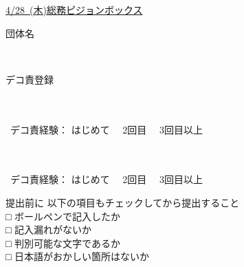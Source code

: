 \documentclass[paper=b5j, fleqn, jafontsize=9pt, jafontscale=1, head_space=25.5mm, foot_space=15mm, fore-edge=9.5mm, gutter=9.5mm, hanging_punctuation, baselineskip=7mm]{jlreq}
\begin{document}
\pagestyle{normals}
\begin{center}
    {\selectsize{15pt}{15pt}}
    \vskip5mm
\end{center}
\uline{{\selectsize{10pt}{10pt}\uline{4/28~({\selectsize{9pt}{9pt}木})}}}\uline{総務ピジョンボックス}\\

\begin{question}{団体名}
\end{question}
\kasen[width=100mm]{}\\

\begin{question}{デコ責登録}
\end{question}
\vspace{-10mm}
\begin{enumsquare}
    \item {}\\\\\indent ~デコ責経験： はじめて　 2回目　 3回目以上
    \item {}\\\\\indent ~デコ責経験： はじめて　 2回目　 3回目以上
\end{enumsquare}
\vfill
\begin{framebox-simple}{提出前に}
    \noindent {}以下の項目もチェックしてから提出すること\\
    □ ボールペンで記入したか\\
    □ 記入漏れがないか\\
    □ 判別可能な文字であるか\\
    □ 日本語がおかしい箇所はないか
\end{framebox-simple}
\end{document}
